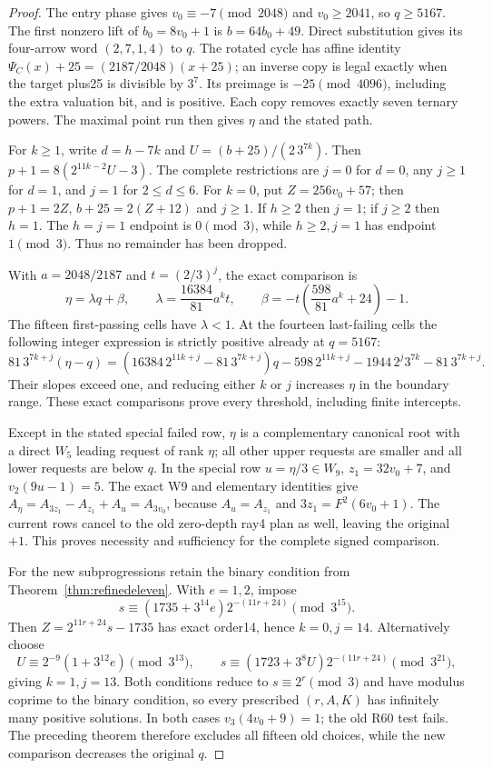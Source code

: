 \documentclass[11pt]{article}
\begin{document}
\begin{proof}
The entry phase gives $v_0\equiv-7\pmod{2048}$ and $v_0\ge2041$,
so $q\ge5167$. The first nonzero lift of $b_0=8v_0+1$ is
$b=64b_0+49$. Direct substitution gives its four-arrow word
$(2,7,1,4)$ to $q$. The rotated cycle has affine identity
$\Psi_C(x)+25=(2187/2048)(x+25)$; an inverse copy is legal exactly
when the target plus25 is divisible by $3^7$. Its preimage is
$-25\pmod{4096}$, including the extra valuation bit, and is positive.
Each copy removes exactly seven ternary powers. The maximal point run
then gives $\eta$ and the stated path.

For $k\ge1$, write $d=h-7k$ and $U=(b+25)/(2\,3^{7k})$.
Then $p+1=8(2^{11k-2}U-3)$. The complete restrictions are
$j=0$ for $d=0$, any $j\ge1$ for $d=1$, and $j=1$ for
$2\le d\le6$. For $k=0$, put $Z=256v_0+57$; then
$p+1=2Z$, $b+25=2(Z+12)$ and $j\ge1$.
If $h\ge2$ then $j=1$; if $j\ge2$ then $h=1$.
The $h=j=1$ endpoint is $0\pmod3$, while $h\ge2,j=1$
has endpoint $1\pmod3$. Thus no remainder has been dropped.

With $a=2048/2187$ and $t=(2/3)^j$, the exact comparison is
\[
 \eta=\lambda q+\beta,\qquad
 \lambda=\frac{16384}{81}a^kt,\qquad
 \beta=-t\left(\frac{598}{81}a^k+24\right)-1.
\]
The fifteen first-passing cells have $\lambda<1$.
At the fourteen last-failing cells the following integer expression
is strictly positive already at $q=5167$:
\[
 81\,3^{7k+j}(\eta-q)
 =(16384\,2^{11k+j}-81\,3^{7k+j})q
 -598\,2^{11k+j}-1944\,2^j3^{7k}-81\,3^{7k+j}.
\]
Their slopes exceed one, and reducing either $k$ or $j$ increases
$\eta$ in the boundary range. These exact comparisons prove every
threshold, including finite intercepts.

Except in the stated special failed row, $\eta$ is a complementary
canonical root with a direct $W_5$ leading request of rank $\eta$;
all other upper requests are smaller and all lower requests are below
$q$. In the special row $u=\eta/3\in W_9$, $z_1=32v_0+7$,
and $v_2(9u-1)=5$. The exact W9 and elementary identities give
$A_\eta=A_{3z_1}-A_{z_1}+A_u=A_{3v_0}$, because
$A_u=A_{z_1}$ and $3z_1=F^2(6v_0+1)$.
The current rows cancel to the old zero-depth ray4 plan as well,
leaving the original $+1$. This proves necessity and sufficiency
for the complete signed comparison.

For the new subprogressions retain the binary condition from
Theorem~\ref{thm:refinedeleven}. With $e=1,2$, impose
\[
 s\equiv(1735+3^{14}e)2^{-(11r+24)}\pmod{3^{15}}.
\]
Then $Z=2^{11r+24}s-1735$ has exact order14, hence $k=0,j=14$.
Alternatively choose
\[
 U\equiv2^{-9}(1+3^{12}e)\pmod{3^{13}},\qquad
 s\equiv(1723+3^8U)2^{-(11r+24)}\pmod{3^{21}},
\]
giving $k=1,j=13$. Both conditions reduce to $s\equiv2^r\pmod3$
and have modulus coprime to the binary condition, so every prescribed
$(r,A,K)$ has infinitely many positive solutions. In both cases
$v_3(4v_0+9)=1$; the old R60 test fails. The preceding theorem
therefore excludes all fifteen old choices, while the new comparison
decreases the original $q$.
\end{proof}
\end{document}
